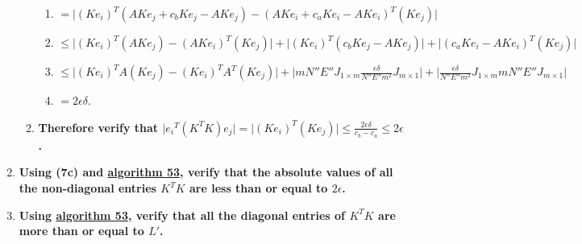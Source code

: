 \documentclass[twocolumn]{article}
\begin{document}
\begin{enumerate}
\begin{enumerate}
\begin{enumerate}
						\item $=\lvert(Ke_i)^T(AKe_j+c_bKe_j-AKe_j)-(AKe_i+c_aKe_i-AKe_i)^T(Ke_j)\rvert$
						\item $\le\lvert(Ke_i)^T(AKe_j)-(AKe_i)^T(Ke_j)\rvert+\lvert(Ke_i)^T(c_bKe_j-AKe_j)\rvert+\lvert(c_aKe_i-AKe_i)^T(Ke_j)\rvert$
						\item $\le\lvert(Ke_i)^TA(Ke_j)-(Ke_i)^TA^T(Ke_j)\rvert+\lvert mN''E''J_{1\times m}\frac{\epsilon\delta}{N''E''m^2}J_{m\times 1}\rvert+\lvert\frac{\epsilon\delta}{N''E''m^2}J_{1\times m}mN''E''J_{m\times 1}\rvert$
						\item $=2\epsilon\delta$.
					\end{enumerate}
					\item \textbf{Therefore verify that $\lvert {e_i}^T(K^TK)e_j\rvert=\lvert(Ke_i)^T(Ke_j)\rvert\le\frac{2\epsilon\delta}{c_b-c_a}\le 2\epsilon$.}
				\end{enumerate}
				\item \textbf{Using (7c) and \hyperref[sec:algorithm 53]{algorithm 53}, verify that the absolute values of all the non-diagonal entries $K^TK$ are less than or equal to $2\epsilon$.}
				\item \textbf{Using \hyperref[sec:algorithm 53]{algorithm 53}, verify that all the diagonal entries of $K^TK$ are more than or equal to $L'$.}
			\end{enumerate}
\end{document}
